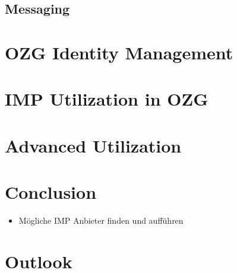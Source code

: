 \documentclass[
     12pt,         %
     a4paper,      %
     BCOR=10mm,version=first,     %
     DIV=14,version=first,        %
     ]{scrreprt}
\begin{document}


\section{Messaging}



\chapter{OZG Identity Management}



\chapter{IMP Utilization in OZG}



\chapter{Advanced Utilization}



\chapter{Conclusion}

\begin{itemize}
    \item Mögliche IMP Anbieter finden und aufführen
\end{itemize}

\chapter{Outlook}

\printbibliography
\end{document}
